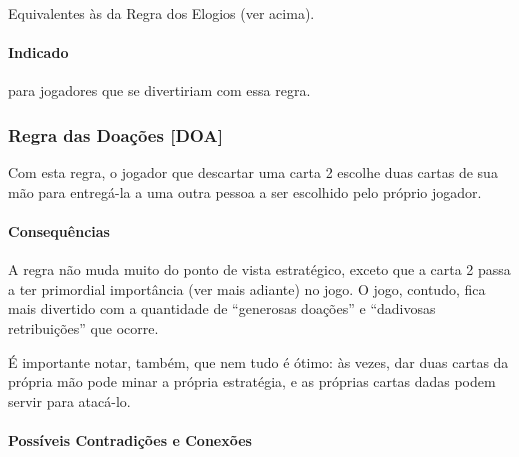 Equivalentes às da Regra dos Elogios (ver acima).

\paragraph{Indicado}

para jogadores que se divertiriam com essa regra.

\subsubsection{Regra das Doações [DOA]}

Com esta regra, o jogador que descartar uma carta 2 escolhe duas cartas de sua mão para entregá-la a uma outra pessoa a ser escolhido pelo próprio jogador.

\paragraph{Consequências}

A regra não muda muito do ponto de vista estratégico, exceto que a carta 2 passa a ter primordial importância (ver mais adiante) no jogo. O jogo, contudo, fica mais divertido com a quantidade de ``generosas doações'' e ``dadivosas retribuições'' que ocorre.

É importante notar, também, que nem tudo é ótimo: às vezes, dar duas cartas da própria mão pode minar a própria estratégia, e as próprias cartas dadas podem servir para atacá-lo.

\paragraph{Possíveis Contradições e Conexões}

